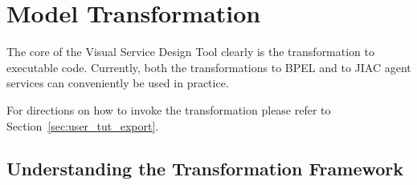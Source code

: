 \chapter{Model Transformation}
\label{sec:user_trafo}

The core of the Visual Service Design Tool clearly is the transformation to
executable code.  Currently, both the transformations to BPEL and to JIAC agent
services can conveniently be used in practice.

For directions on how to invoke the transformation please refer to
Section~\ref{sec:user_tut_export}.



\section{Understanding the Transformation Framework}
\label{sec:user_trafo_intro}


